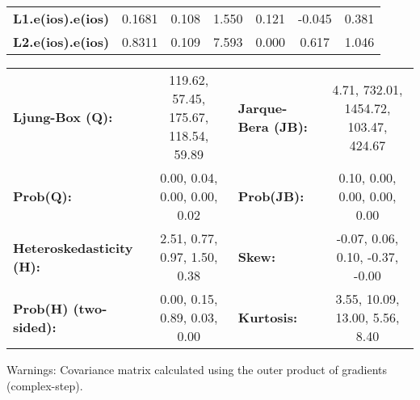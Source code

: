 \begin{center}
\begin{tabular}{lcccccc}
\textbf{L1.e(ios).e(ios)} &       0.1681  &        0.108     &     1.550  &         0.121        &       -0.045    &        0.381     \\
\textbf{L2.e(ios).e(ios)} &       0.8311  &        0.109     &     7.593  &         0.000        &        0.617    &        1.046     \\
\bottomrule
\end{tabular}
\begin{tabular}{lclc}
\textbf{Ljung-Box (Q):}          & 119.62, 57.45, 175.67, 118.54, 59.89 & \textbf{  Jarque-Bera (JB):  } & 4.71, 732.01, 1454.72, 103.47, 424.67  \\
\textbf{Prob(Q):}                &     0.00, 0.04, 0.00, 0.00, 0.02     & \textbf{  Prob(JB):          } &      0.10, 0.00, 0.00, 0.00, 0.00      \\
\textbf{Heteroskedasticity (H):} &     2.51, 0.77, 0.97, 1.50, 0.38     & \textbf{  Skew:              } &    -0.07, 0.06, 0.10, -0.37, -0.00     \\
\textbf{Prob(H) (two-sided):}    &     0.00, 0.15, 0.89, 0.03, 0.00     & \textbf{  Kurtosis:          } &     3.55, 10.09, 13.00, 5.56, 8.40     \\
\bottomrule
\end{tabular}
\end{center}

Warnings: \newline
 [1] Covariance matrix calculated using the outer product of gradients (complex-step).